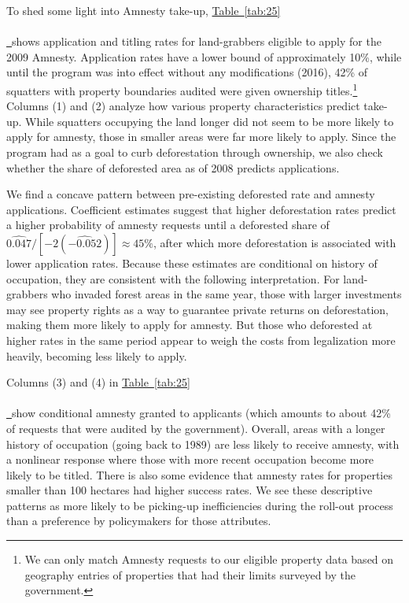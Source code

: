 \documentclass[12pt]{article}
\newcommand*{\tabref}[2][]{%
  \hyperref[{tab:#2}]{%
    Table~\ref*{tab:#2}%
    \ifx\\#1\\%
    \else
      \,#1%
    \fi
  }%
}
\begin{document}
\quad To shed some light into Amnesty take-up, \tabref{25} shows application and titling rates for land-grabbers eligible to apply for the 2009 Amnesty. Application rates have a lower bound of approximately 10\%, while until the program was into effect without any modifications (2016), 42\% of squatters with property boundaries audited were given ownership titles.\footnote{We can only match Amnesty requests to our eligible property data based on geography entries of properties that had their limits surveyed by the government. } Columns (1) and (2) analyze how various property characteristics predict take-up. While squatters occupying the land longer did not seem to be more likely to apply for amnesty, those in smaller areas were far more likely to apply. Since the program had as a goal to curb deforestation through ownership, we also check whether the share of deforested area as of 2008 predicts applications. 
\ 

\quad We find a concave pattern between pre-existing deforested rate and amnesty applications. Coefficient estimates suggest that higher deforestation rates predict a higher probability of amnesty requests until a deforested share of $\widehat{0.047}/[-2(\widehat{-0.052})]\approx45\%$, after which more deforestation is associated with lower application rates. Because these estimates are conditional on history of occupation, they are consistent with the following interpretation. For land-grabbers who invaded forest areas in the same year, those with larger investments may see property rights as a way to guarantee private returns on deforestation, making them more likely to apply for amnesty. But those who deforested at higher rates in the same period appear to weigh the costs from legalization more heavily, becoming less likely to apply.
\ 

\quad Columns (3) and (4) in \tabref{25} show conditional amnesty granted to applicants (which amounts to about 42\% of requests that were audited by the government). Overall, areas with a longer history of occupation (going back to 1989) are less likely to receive amnesty, with a nonlinear response where those with more recent occupation become more likely to be titled. There is also some evidence that amnesty rates for properties smaller than 100 hectares had higher success rates. We see these descriptive patterns as more likely to be picking-up inefficiencies during the roll-out process than a preference by policymakers for those attributes.
\end{document}
